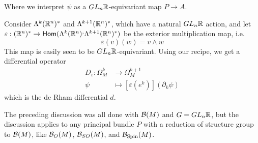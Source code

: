 Where we interpret $\psi$ as a $GL_n\mathbb{R}$-equivariant map $P \to A$.
%
\begin{exmp}
Consider $\Lambda^k(\mathbb{R}^n)^*$ and $\Lambda^{k+1}(\mathbb{R}^n)^*$, which have a natural
$GL_n\mathbb{R}$ action, and let
$\varepsilon : (\mathbb{R}^n)^* \to \mathsf{Hom}(\Lambda^k(\mathbb{R}^n)^,\Lambda^{k+1}(\mathbb{R}^n)^*)$
be the exterior multiplication map, i.e.
\[
\varepsilon(v)(w) = v \wedge w
\]
This map is easily seen to be $GL_n\mathbb{R}$-equivariant. Using our recipe, we get a
differential operator
\begin{align*}
D_\varepsilon : \Omega^k_M &\to \Omega^{k+1}_M \\
\psi &\mapsto [\varepsilon(e^k)](\partial_k\psi)
\end{align*}
which is the de Rham differential $d$.
\end{exmp}
%
The preceding discussion was all done with $\mathcal{B}(M)$ and $G = GL_n\mathbb{R}$, but the
discussion applies to any principal bundle $P$ with a reduction of structure
group to $\mathcal{B}(M)$, like $\mathcal{B}_O(M)$, $\mathcal{B}_{SO}(M)$, and $\mathcal{B}_{\mathrm{Spin}}(M)$. \\
%

